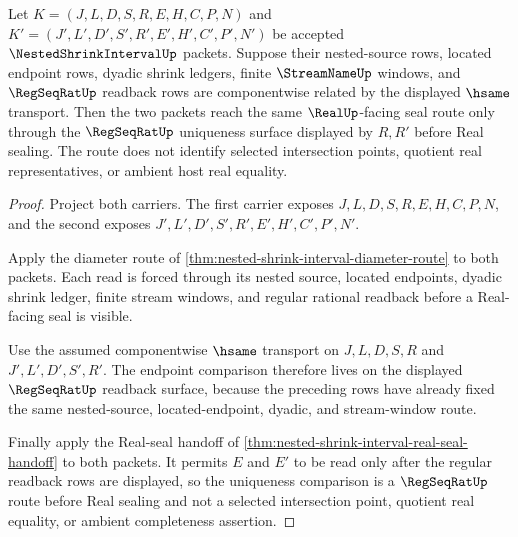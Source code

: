 \begin{theorem}
\label{thm:nested-shrink-interval-regular-cauchy-uniqueness-route}
Let $K=(J,L,D,S,R,E,H,C,P,N)$ and $K'=(J',L',D',S',R',E',H',C',P',N')$ be accepted $\NestedShrinkIntervalUp$ packets. Suppose their nested-source rows, located endpoint rows, dyadic shrink ledgers, finite $\StreamNameUp$ windows, and $\RegSeqRatUp$ readback rows are componentwise related by the displayed $\hsame$ transport. Then the two packets reach the same $\RealUp$-facing seal route only through the $\RegSeqRatUp$ uniqueness surface displayed by $R,R'$ before Real sealing. The route does not identify selected intersection points, quotient real representatives, or ambient host real equality.
\end{theorem}
\begin{proof}
Project both carriers. The first carrier exposes $J,L,D,S,R,E,H,C,P,N$, and the second exposes $J',L',D',S',R',E',H',C',P',N'$.

Apply the diameter route of \autoref{thm:nested-shrink-interval-diameter-route} to both packets. Each read is forced through its nested source, located endpoints, dyadic shrink ledger, finite stream windows, and regular rational readback before a Real-facing seal is visible.

Use the assumed componentwise $\hsame$ transport on $J,L,D,S,R$ and $J',L',D',S',R'$. The endpoint comparison therefore lives on the displayed $\RegSeqRatUp$ readback surface, because the preceding rows have already fixed the same nested-source, located-endpoint, dyadic, and stream-window route.

Finally apply the Real-seal handoff of \autoref{thm:nested-shrink-interval-real-seal-handoff} to both packets. It permits $E$ and $E'$ to be read only after the regular readback rows are displayed, so the uniqueness comparison is a $\RegSeqRatUp$ route before Real sealing and not a selected intersection point, quotient real equality, or ambient completeness assertion.
\end{proof}

